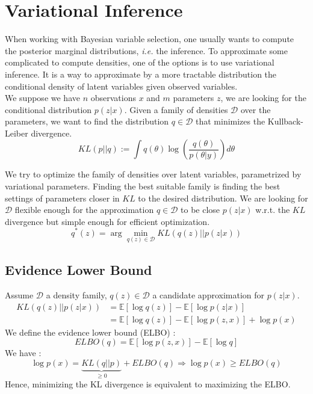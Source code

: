 \section{Variational Inference}
When working with Bayesian variable selection, one usually wants to compute the posterior marginal distributions, \textit{i.e.} the inference. To approximate some complicated to compute densities, one of the options is to use variational inference. It is a way to approximate by a more tractable distribution the conditional density of latent variables given observed variables.\\
We suppose we have $n$ observations $x$ and $m$ parameters $z$, we are looking for the conditional distribution $p(z|x)$. Given a family of densities $\mathcal{D}$ over the parameters, we want to find the distribution $q \in \mathcal{D}$ that minimizes the Kullback-Leiber divergence. \\

\begin{equation}
KL(p||q) := \int q(\theta)\log\left(\frac{q(\theta)}{p(\theta|y)}\right) d\theta
\label{eq:KL_div}
\end{equation}

We try to optimize the family of densities over latent variables, parametrized by variational parameters. Finding the best suitable family is finding the best settings of parameters closer in $KL$ to the desired distribution. We are looking for $\mathcal{D}$ flexible enough for the approximation $q \in \mathcal{D}$ to be close $p(z|x)$ w.r.t. the $KL$ divergence but simple enough for efficient optimization.\\

\begin{equation}
q^*(z) = \arg\min_{q(z) \in \mathcal{D}} KL(q(z)||p(z|x))
\label{eq:best_q}
\end{equation}

\subsection{Evidence Lower Bound}

Assume $\mathcal{D}$ a density family, $q(z) \in \mathcal{D}$ a candidate approximation for $p(z|x)$.
\begin{align}
KL(q(z)||p(z|x)) &= \mathbb{E}\left[\log q(z)\right] - \mathbb{E}\left[\log p(z|x)\right]\\
&= \mathbb{E}\left[\log q(z)\right] - \mathbb{E}\left[\log p(z,x)\right] + \log p(x)
\label{eq:KL_to_logP}
\end{align} 
We define the evidence lower bound (ELBO) :
\begin{equation}
ELBO(q) = \mathbb{E}\left[\log p(z,x)\right] - \mathbb{E}\left[\log q\right]
\label{eq:ELBO}
\end{equation}
We have :
\begin{equation}
\log p(x) = \underbrace{KL(q||p)}_{\geq 0} + ELBO(q) \Rightarrow \log p(x) \geq ELBO(q)
\label{eq:ELBO+KL}
\end{equation}
Hence, minimizing the KL divergence is equivalent to maximizing the ELBO.\\

